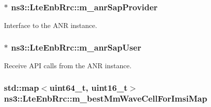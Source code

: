 \subsubsection[{\texorpdfstring{m\+\_\+anr\+Sap\+Provider}{m_anrSapProvider}}]{$\ast$ ns3\+::\+Lte\+Enb\+Rrc\+::m\+\_\+anr\+Sap\+Provider\hspace{0.3cm}{\ttfamily [private]}}\hypertarget{classns3_1_1LteEnbRrc_a8a50cc3ec7f8a766729695ad3f0d6e9c}{}\label{classns3_1_1LteEnbRrc_a8a50cc3ec7f8a766729695ad3f0d6e9c}


Interface to the A\+NR instance. 

\subsubsection[{\texorpdfstring{m\+\_\+anr\+Sap\+User}{m_anrSapUser}}]{$\ast$ ns3\+::\+Lte\+Enb\+Rrc\+::m\+\_\+anr\+Sap\+User\hspace{0.3cm}{\ttfamily [private]}}\hypertarget{classns3_1_1LteEnbRrc_a73755edf0b4ef491bb008a2c80564c68}{}\label{classns3_1_1LteEnbRrc_a73755edf0b4ef491bb008a2c80564c68}


Receive A\+PI calls from the A\+NR instance. 

\subsubsection[{\texorpdfstring{m\+\_\+best\+Mm\+Wave\+Cell\+For\+Imsi\+Map}{m_bestMmWaveCellForImsiMap}}]{\setlength{\rightskip}{0pt plus 5cm}std\+::map$<$uint64\+\_\+t, uint16\+\_\+t$>$ ns3\+::\+Lte\+Enb\+Rrc\+::m\+\_\+best\+Mm\+Wave\+Cell\+For\+Imsi\+Map\hspace{0.3cm}{\ttfamily [private]}}\hypertarget{classns3_1_1LteEnbRrc_a38d5bf3d53b16596824f07d4b4a1eab7}{}\label{classns3_1_1LteEnbRrc_a38d5bf3d53b16596824f07d4b4a1eab7}
